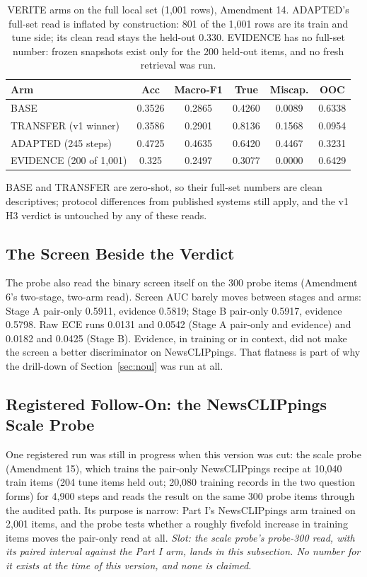 \documentclass{article} %
\begin{document}
\begin{table}[t]
\centering
\small
\caption{VERITE arms on the full local set (1,001 rows), Amendment 14. ADAPTED's full-set read is inflated by construction: 801 of the 1,001 rows are its train and tune side; its clean read stays the held-out 0.330. EVIDENCE has no full-set number: frozen snapshots exist only for the 200 held-out items, and no fresh retrieval was run.}
\label{tab:veritefull}
\begin{tabular}{lccccc}
\toprule
Arm & Acc & Macro-F1 & True & Miscap. & OOC \\
\midrule
BASE & 0.3526 & 0.2865 & 0.4260 & 0.0089 & 0.6338 \\
TRANSFER (v1 winner) & 0.3586 & 0.2901 & 0.8136 & 0.1568 & 0.0954 \\
ADAPTED (245 steps) & 0.4725 & 0.4635 & 0.6420 & 0.4467 & 0.3231 \\
EVIDENCE (200 of 1,001) & 0.325 & 0.2497 & 0.3077 & 0.0000 & 0.6429 \\
\bottomrule
\end{tabular}
\end{table}

BASE and TRANSFER are zero-shot, so their full-set numbers are clean descriptives; protocol differences from published systems still apply, and the v1 H3 verdict is untouched by any of these reads.

\subsection{The Screen Beside the Verdict}
The probe also read the binary screen itself on the 300 probe items (Amendment 6's two-stage, two-arm read). Screen AUC barely moves between stages and arms: Stage A pair-only 0.5911, evidence 0.5819; Stage B pair-only 0.5917, evidence 0.5798. Raw ECE runs 0.0131 and 0.0542 (Stage A pair-only and evidence) and 0.0182 and 0.0425 (Stage B). Evidence, in training or in context, did not make the screen a better discriminator on NewsCLIPpings. That flatness is part of why the drill-down of Section~\ref{sec:noul} was run at all.

\subsection{Registered Follow-On: the NewsCLIPpings Scale Probe}
One registered run was still in progress when this version was cut: the scale probe (Amendment 15), which trains the pair-only NewsCLIPpings recipe at 10,040 train items (204 tune items held out; 20,080 training records in the two question forms) for 4,900 steps and reads the result on the same 300 probe items through the audited path. Its purpose is narrow: Part I's NewsCLIPpings arm trained on 2,001 items, and the probe tests whether a roughly fivefold increase in training items moves the pair-only read at all. \textit{Slot: the scale probe's probe-300 read, with its paired interval against the Part I arm, lands in this subsection. No number for it exists at the time of this version, and none is claimed.}
\end{document}
